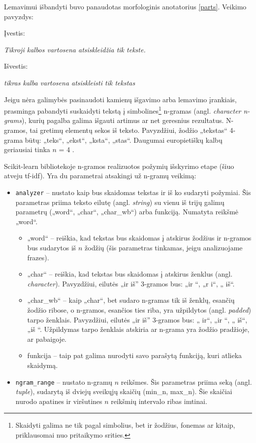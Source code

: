 \documentclass{VUMIFInfBakalaurinis}
\begin{document}
Lemavimui išbandyti buvo panaudotas morfologinis anotatorius \ref{parts}. Veikimo
pavyzdys:

Įvestis:

\emph{Tikroji kalbos vartosena atsiskleidžia tik tekste.}

Išvestis:

\emph{tikras kalba vartosena atsiskleisti tik tekstas}

\label{ngram}

Jeigu nėra galimybės pasinaudoti kamienų išgavimo arba lemavimo
įrankiais, prasminga pabandyti suskaidyti tekstą į simbolines\footnote{Skaidyti
  galima ne tik pagal simbolius, bet ir žodžius, fonemas ar kitaip,
  priklausomai nuo pritaikymo srities.} n-gramas (angl. \emph{character
n-grams}), kurių pagalba galima išgauti artimus ar net geresnius
rezultatus. N-gramos, tai gretimų elementų sekos iš teksto. Pavyzdžiui,
žodžio „tekstas“ 4-grama būtų: „teks“, „ekst“, „ksta“, „stas“.
Daugumai europietiškų kalbų geriausiai tinka $n$ = 4 \cite{mcnamee2008don}.

Scikit-learn bibliotekoje n-gramos realizuotos požymių išskyrimo etape
(šiuo atveju tf-idf). Yra du parametrai atsakingi už n-gramų veikimą:

\begin{itemize}
\item
  \texttt{analyzer} -- nustato kaip bus skaidomas tekstas ir iš ko
  sudaryti požymiai. Šis parametras priima teksto eilutę (angl.
  \emph{string}) su vienu iš trijų galimų parametrų („word“, „char“,
  „char\_wb“) arba funkciją. Numatyta reikšmė „word“.

  \begin{itemize}
  \item
    „word“ -- reiškia, kad tekstas bus skaidomas į atskirus žodžius ir
    n-gramos bus sudarytos iš $n$ žodžių (šis parametras tinkamas,
    jeigu analizuojame frazes).
  \item
    „char“ -- reiškia, kad tekstas bus skaidomas į atskirus ženklus
    (angl. \emph{character}). Pavyzdžiui, eilutės „ir iš'' 3-gramos bus:
    „ir “, „r i“, „ iš“.
  \item
    „char\_wb“ -- kaip „char“, bet sudaro n-gramas tik iš ženklų,
    esančių žodžio ribose, o n-gramos, esančios ties riba, yra
    užpildytos (angl. \emph{padded}) tarpo ženklais. Pavyzdžiui, eilutės
    „ir iš'' 3-gramos bus: „ ir“, „ir “, „ iš“, „iš “. Užpildymas
    tarpo ženklais atskiria ar n-grama yra žodžio pradžioje, ar
    pabaigoje.
  \item
    funkcija -- taip pat galima nurodyti savo parašytą funkciją, kuri
    atlieka skaidymą.
  \end{itemize}
\item
  \texttt{ngram\_range} -- nustato n-gramų $n$ reikšmes. Šis
  parametras priima seką (angl. \emph{tuple}), sudarytą iš dviejų
  sveikųjų skaičių (min\_n, max\_n). Šie skaičiai nurodo apatines ir
  viršutines $n$ reikšmių intervalo ribas imtinai.
\end{itemize}
\end{document}
